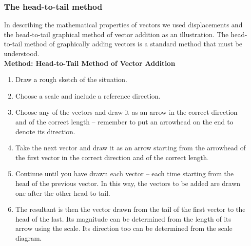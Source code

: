 \subsubsection*{The head-to-tail method}
In describing the mathematical properties of vectors we used
displacements and the head-to-tail graphical method of vector addition
as an illustration. The head-to-tail method of graphically adding vectors is a standard method that must be understood.\\

\textbf{Method: Head-to-Tail Method of Vector Addition}
\begin{enumerate}[noitemsep, label=\textbf{\arabic*}.]
\item{Draw a rough sketch of the situation.}
\item{Choose a scale and include a reference direction.}
\item{Choose any of the vectors and draw it as an arrow in the
correct direction and of the correct length -- remember to put an
arrowhead on the end to denote its direction.}
\item{Take the next vector and draw it as an arrow starting from the
arrowhead of the first vector in the correct direction and of the
correct length.}
\item{Continue until you have drawn each vector -- each time starting
from the head of the previous vector. In this way, the vectors to be
added are drawn one after the other head-to-tail.}
\item{The resultant is then the vector drawn from the tail of the
first vector to the head of the last. Its magnitude can be
determined from the length of its arrow using the scale. Its
direction too can be determined from the scale diagram.}
\end{enumerate}


